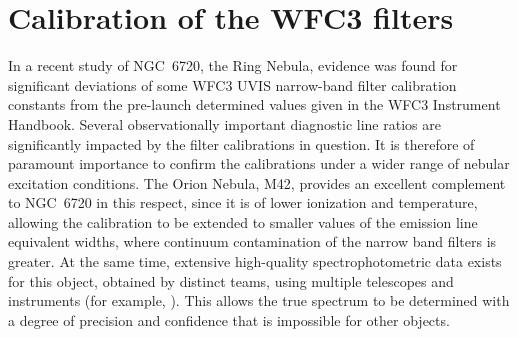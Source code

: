 \documentclass[preprint]{aastex}
\begin{document}






\appendix

\section{Calibration of the WFC3 filters}

In a recent study \citep{ODell:2013b} of NGC~6720, the Ring Nebula,
evidence was found for significant deviations of some WFC3 UVIS
narrow-band filter calibration constants from the pre-launch
determined values given in the WFC3 Instrument Handbook.  Several
observationally important diagnostic line ratios are significantly
impacted by the filter calibrations in question.  It is therefore of
paramount importance to confirm the calibrations under a wider range
of nebular excitation conditions.  The Orion Nebula, M42, provides an
excellent complement to NGC~6720 in this respect, since it is of lower
ionization and temperature, allowing the calibration to be extended to
smaller values of the emission line equivalent widths, where continuum
contamination of the narrow band filters is greater.  At the same
time, extensive high-quality spectrophotometric data exists for this object,
obtained by distinct teams, using multiple telescopes and instruments
(for example, \citealp{Mesa-Delgado:2008b, ODell:2010a}).  This allows
the true spectrum to be determined with a degree of precision and
confidence that is impossible for other objects.


\end{document}

